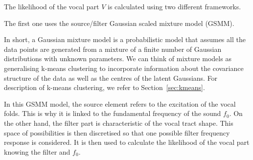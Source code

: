 The likelihood of the vocal part $V$ is calculated using two different frameworks. 

The first one uses the source/filter Gaussian scaled mixture model (GSMM). 

In short, a Gaussian mixture model is a probabilistic model that assumes all the data points are generated from a mixture of a finite number of Gaussian distributions with unknown parameters. We can think of mixture models as generalising k-means clustering to incorporate information about the covariance structure of the data as well as the centres of the latent Gaussians. For description of k-means clustering, we refer to Section~\ref{sec:kmeans}.

In this GSMM model, the source element refers to the excitation of the vocal folds. This is why it is linked to the fundamental frequency of the sound $f_{\text{0}}$. On the other hand, the filter part is characteristic of the vocal tract shape. This space of possibilities is then discretised so that one possible filter frequency response is considered. It is then used to calculate the likelihood of the vocal part knowing the filter and $f_{\text{0}}$.

